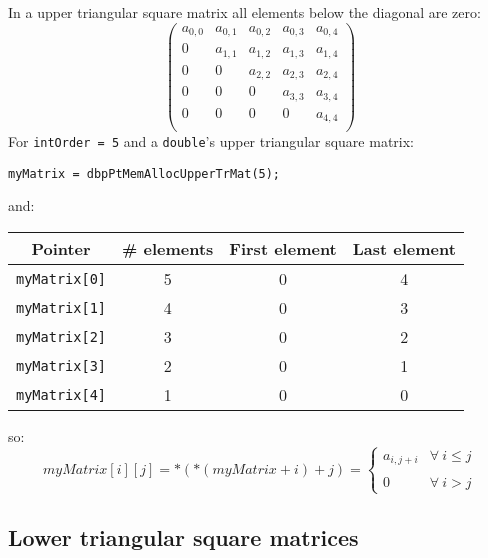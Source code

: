 In a upper triangular square matrix all elements below the diagonal are zero: 
%
\begin{displaymath}
\left( \begin{array}{ccccc}
  a_{0,0} & a_{0,1} & a_{0,2} & a_{0,3} & a_{0,4} \\
  0      & a_{1,1} & a_{1,2} & a_{1,3} & a_{1,4} \\ 
  0      & 0      & a_{2,2} & a_{2,3} & a_{2,4} \\
  0      & 0      & 0      & a_{3,3} & a_{3,4} \\
  0      & 0      & 0      & 0      & a_{4,4} \\
\end{array} \right)
\end{displaymath}
%
For \texttt{intOrder = 5} and a \texttt{double}'s upper triangular square matrix:
%
\begin{verbatim}
myMatrix = dbpPtMemAllocUpperTrMat(5);  
\end{verbatim}
%
and:
\begin{center}
  \begin{tabular}{|c|c|c|c|}
    \hline
    \textbf{Pointer} & \textbf{\# elements} & \textbf{First element} & \textbf{Last element}\\
    \hline
    \texttt{myMatrix[0]} & 5 & 0 & 4\\
    \hline
    \texttt{myMatrix[1]} & 4 & 0 & 3\\
    \hline
    \texttt{myMatrix[2]} & 3 & 0 & 2\\
    \hline
    \texttt{myMatrix[3]} & 2 & 0 & 1\\
    \hline
    \texttt{myMatrix[4]} & 1 & 0 & 0\\
    \hline
  \end{tabular}
\end{center}
%
so:
%
\begin{displaymath}
  myMatrix[i][j] = *(*(myMatrix + i) + j) = \left\{ \begin{array}{ll}
    a_{i,j+i} & \forall \ i \le j \\
     & \\
    0 & \forall \ i > j
    \end{array} \right.    
\end{displaymath}

\subsection{Lower triangular square matrices}

